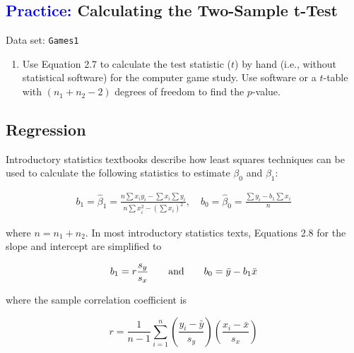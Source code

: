 \documentclass[
]{report}
\providecommand{\tightlist}{%
  \setlength{\itemsep}{0pt}\setlength{\parskip}{0pt}}
\begin{document}
\hypertarget{calculating-the-two-sample-t-test}{%
\subsection*{\texorpdfstring{\textcolor{blue}{Practice:} Calculating the Two-Sample t-Test}{ Calculating the Two-Sample t-Test}}\label{calculating-the-two-sample-t-test}}

Data set: \texttt{Games1}

\begin{enumerate}
\def\labelenumi{\arabic{enumi}.}
\setcounter{enumi}{33}
\tightlist
\item
  Use Equation 2.7 to calculate the test statistic (\(\scriptstyle t\)) by hand (i.e., without statistical software) for the computer game study. Use software or a \(\scriptstyle t\)-table with \(\scriptstyle (n_1 + n_2 - 2)\) degrees of freedom to find the \(\scriptstyle p\)-value.
\end{enumerate}

\hypertarget{regression}{%
\subsection*{Regression}\label{regression}}

Introductory statistics textbooks describe how least squares techniques can be used to calculate the following statistics to estimate \(\scriptstyle \beta_0\) and \(\scriptstyle \beta_1\):

\begin{align} 
\label{2.8}
b_1 = \hat{\beta}_1 = \frac{n\sum x_i y_i - \sum x_i \sum y_i}{n\sum x_i^2 - (\sum x_i)^2}, \quad
b_0 = \hat{\beta}_0 = \frac{\sum y_i - b_1 \sum x_i}{n}
\tag{2.8}
\end{align}

where \(\scriptstyle n = n_1 + n_2\). In most introductory statistics texts, Equations 2.8 for the slope and intercept are simplified to

\begin{align}
b_1 = r \frac{s_y}{s_x}
\qquad \text{and} \qquad
b_0 = \bar{y} - b_1 \bar{x} 
\notag
\end{align}

where the sample correlation coefficient is

\[
r = \frac{1}{n - 1} \sum_{i=1}^{n} \left(\frac{y_i - \bar{y}}{s_y}\right) \left(\frac{x_i - \bar{x}}{s_x}\right)
\]
\end{document}
